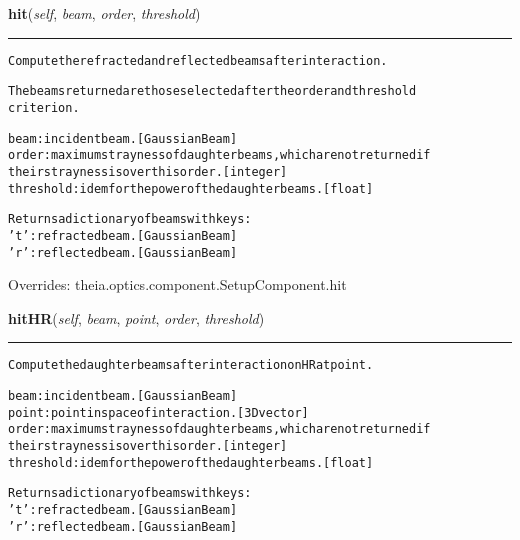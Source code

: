     \vspace{0.5ex}

\hspace{.8\funcindent}\begin{boxedminipage}{\funcwidth}

    \raggedright \textbf{hit}(\textit{self}, \textit{beam}, \textit{order}, \textit{threshold})

    \vspace{-1.5ex}

    \rule{\textwidth}{0.5\fboxrule}
\setlength{\parskip}{2ex}
\begin{alltt}
Compute the refracted and reflected beams after interaction.

The beams returned are those selected after the order and threshold
criterion.

beam: incident beam. [GaussianBeam]
order: maximum strayness of daughter beams, which are not returned if
    their strayness is over this order. [integer]
threshold: idem for the power of the daughter beams. [float]

Returns a dictionary of beams with keys:
    't': refracted beam. [GaussianBeam]
    'r': reflected beam. [GaussianBeam]
\end{alltt}

\setlength{\parskip}{1ex}
      Overrides: theia.optics.component.SetupComponent.hit

    \end{boxedminipage}

    \label{theia:optics:optic:Optic:hitHR}

    \vspace{0.5ex}

\hspace{.8\funcindent}\begin{boxedminipage}{\funcwidth}

    \raggedright \textbf{hitHR}(\textit{self}, \textit{beam}, \textit{point}, \textit{order}, \textit{threshold})

    \vspace{-1.5ex}

    \rule{\textwidth}{0.5\fboxrule}
\setlength{\parskip}{2ex}
\begin{alltt}
Compute the daughter beams after interaction on HR at point.

beam: incident beam. [GaussianBeam]
point: point in space of interaction. [3D vector]
order: maximum strayness of daughter beams, which are not returned if
    their strayness is over this order. [integer]
threshold: idem for the power of the daughter beams. [float]

Returns a dictionary of beams with keys:
    't': refracted beam. [GaussianBeam]
    'r': reflected beam. [GaussianBeam]
\end{alltt}

\setlength{\parskip}{1ex}
    \end{boxedminipage}

